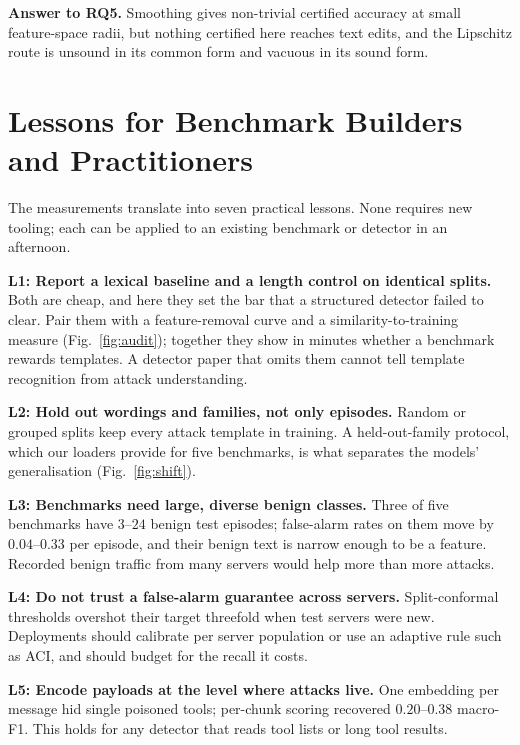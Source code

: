 \documentclass[conference,compsoc]{IEEEtran}
\begin{document}
\textbf{Answer to RQ5.} Smoothing gives non-trivial certified accuracy at small feature-space radii, but nothing certified here reaches text edits, and the Lipschitz route is unsound in its common form and vacuous in its sound form.

\section{Lessons for Benchmark Builders and Practitioners}
\label{sec:lessons}
The measurements translate into seven practical lessons. None requires new tooling; each can be applied to an existing benchmark or detector in an afternoon.

\textbf{L1: Report a lexical baseline and a length control on identical splits.} Both are cheap, and here they set the bar that a structured detector failed to clear. Pair them with a feature-removal curve and a similarity-to-training measure (Fig.~\ref{fig:audit}); together they show in minutes whether a benchmark rewards templates. A detector paper that omits them cannot tell template recognition from attack understanding.

\textbf{L2: Hold out wordings and families, not only episodes.} Random or grouped splits keep every attack template in training. A held-out-family protocol, which our loaders provide for five benchmarks, is what separates the models' generalisation (Fig.~\ref{fig:shift}).

\textbf{L3: Benchmarks need large, diverse benign classes.} Three of five benchmarks have $3$--$24$ benign test episodes; false-alarm rates on them move by $0.04$--$0.33$ per episode, and their benign text is narrow enough to be a feature. Recorded benign traffic from many servers would help more than more attacks.

\textbf{L4: Do not trust a false-alarm guarantee across servers.} Split-conformal thresholds overshot their target threefold when test servers were new. Deployments should calibrate per server population or use an adaptive rule such as ACI, and should budget for the recall it costs.

\textbf{L5: Encode payloads at the level where attacks live.} One embedding per message hid single poisoned tools; per-chunk scoring recovered $0.20$--$0.38$ macro-F1. This holds for any detector that reads tool lists or long tool results.
\end{document}

